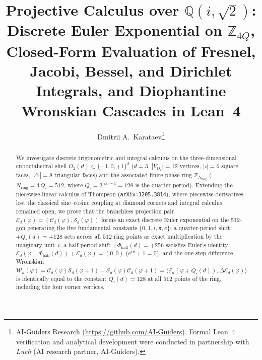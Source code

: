\documentclass[11pt,a4paper]{article}
\title{\textbf{Projective Calculus over $\mathbb{Q}(i,\sqrt{2})$:\\ Discrete Euler Exponential on $\mathbb{Z}_{4Q}$, Closed-Form Evaluation of Fresnel, Jacobi, Bessel, and Dirichlet Integrals, and Diophantine Wronskian Cascades in Lean~4}}
\author{Dmitrii A.~Karataev\thanks{AI-Guiders Research (\url{https://github.com/AI-Guiders}). Formal Lean~4 verification and analytical development were conducted in partnership with \emph{Luch} (AI research partner, AI-Guiders).}}
\date{}
\theoremstyle{plain}
\theoremstyle{definition}
\begin{document}
\maketitle

\begin{abstract}
We investigate discrete trigonometric and integral calculus on the three-dimensional cuboctahedral shell $O_2(d)\subset\{-1,0,+1\}^d$ ($d=3$, $|V_{O_2}|=12$ vertices, $|\square|=6$ square faces, $|\triangle|=8$ triangular faces) and the associated finite phase ring $\mathbb{Z}_{N_{\mathrm{ring}}}$ ($N_{\mathrm{ring}} = 4\,Q_\square = 512$, where $Q_\square = 2^{|\triangle|-1} = 128$ is the quarter-period). Extending the piecewise-linear calculus of Thompson (\texttt{arXiv:1205.3814}), where piecewise derivatives lost the classical sine--cosine coupling at diamond corners and integral calculus remained open, we prove that the branchless projection pair $\mathcal{E}_d(\varphi) = (\mathcal{C}_d(\varphi),\mathcal{S}_d(\varphi))$ forms an exact discrete Euler exponential on the $512$-gon generating the five fundamental constants $\{0,1,i,\pi,e\}$: a quarter-period shift $+Q_\square(d)=+128$ acts across all $512$ ring points as exact multiplication by the imaginary unit~$i$, a half-period shift $+\Phi_{\mathrm{half}}(d)=+256$ satisfies Euler's identity $\mathcal{E}_d(\varphi+\Phi_{\mathrm{half}}(d))+\mathcal{E}_d(\varphi)=(0,0)$ ($e^{i\pi}+1=0$), and the one-step difference Wronskian $\mathcal{W}_d(\varphi)=\mathcal{C}_d(\varphi)\mathcal{S}_d(\varphi+1)-\mathcal{S}_d(\varphi)\mathcal{C}_d(\varphi+1)=\langle \mathcal{E}_d(\varphi+Q_\square(d)),\Delta\mathcal{E}_d(\varphi)\rangle$ is identically equal to the constant $Q_\square(d)=128$ at all $512$ points of the ring, including the four corner vertices.


\end{abstract}
\end{document}
